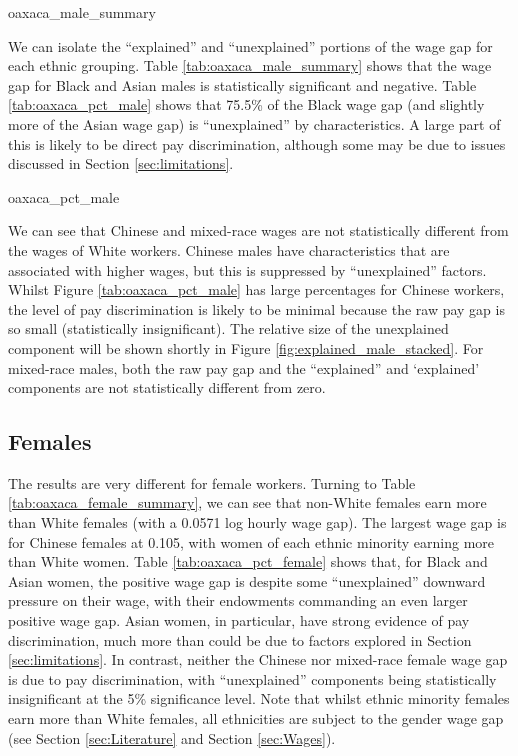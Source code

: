 \documentclass[class=article, crop=false]{standalone}
\begin{document}
{oaxaca_male_summary}

We can isolate the \enquote{explained} and \enquote{unexplained} portions of the wage gap for each ethnic grouping. Table \ref{tab:oaxaca_male_summary} shows that the wage gap for Black and Asian males is statistically significant and negative. Table \ref{tab:oaxaca_pct_male} shows that 75.5\% of the Black wage gap (and slightly more of the Asian wage gap) is \enquote{unexplained} by characteristics. A large part of this is likely to be direct pay discrimination, although some may be due to issues discussed in Section \ref{sec:limitations}.

{oaxaca_pct_male}

We can see that Chinese and mixed-race wages are not statistically different from the wages of White workers. Chinese males have characteristics that are associated with higher wages, but this is suppressed by \enquote{unexplained} factors. Whilst Figure \ref{tab:oaxaca_pct_male} has large percentages for Chinese workers, the level of pay discrimination is likely to be minimal because the raw pay gap is so small (statistically insignificant). The relative size of the unexplained component will be shown shortly in Figure \ref{fig:explained_male_stacked}. For mixed-race males, both the raw pay gap and the \enquote{explained} and \enquote*{explained} components are not statistically different from zero.

\subsection{Females}
\label{sec:Females}
The results are very different for female workers. Turning to Table \ref{tab:oaxaca_female_summary}, we can see that non-White females earn more than White females (with a 0.0571 log hourly wage gap). The largest wage gap is for Chinese females at 0.105, with women of each ethnic minority earning more than White women. Table \ref{tab:oaxaca_pct_female} shows that, for Black and Asian women, the positive wage gap is despite some \enquote{unexplained} downward pressure on their wage, with their endowments commanding an even larger positive wage gap. Asian women, in particular, have strong evidence of pay discrimination, much more than could be due to factors explored in Section \ref{sec:limitations}. In contrast, neither the Chinese nor mixed-race female wage gap is due to pay discrimination, with \enquote{unexplained} components being statistically insignificant at the 5\% significance level. Note that whilst ethnic minority females earn more than White females, all ethnicities are subject to the gender wage gap (see Section \ref{sec:Literature} and Section \ref{sec:Wages}).
\end{document}
